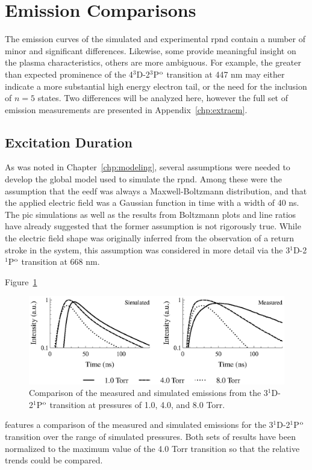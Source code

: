 \section{Emission Comparisons}

The emission curves of the simulated and experimental \acs{rpnd} contain a
number of minor and significant differences. Likewise, some provide meaningful
insight on the plasma characteristics, others are more ambiguous. For example,
the greater than expected prominence of the 4$^3$D-2$^3$P$^\mathrm{o}$ transition at
447 nm may either indicate a more substantial high energy electron tail, or the
need for the inclusion of $n=5$ states. Two differences will be analyzed here,
however the full set of emission measurements are presented in
Appendix~\ref{chp:extraem}.

\subsection{Excitation Duration}

As was noted in Chapter~\ref{chp:modeling}, several assumptions were needed to
develop the global model used to simulate the \acs{rpnd}. Among these were the
assumption that the \acs{eedf} was always a Maxwell-Boltzmann distribution, and
that the applied electric field was a Gaussian function in time with a width of
40 ns. The \acs{pic} simulations as well as the results from Boltzmann plots and
line ratios have already suggested that the former assumption is not rigorously
true. While the electric field shape was originally inferred from the
observation of a return stroke in the system, this assumption was considered in
more detail via the 3$^1$D-2$^1$P$^\mathrm{o}$ transition at 668 nm.

Figure~\ref{fig:dpcomp}
\begin{figure}
  \centering
  \includegraphics{./chapters/emissions/figures/dpcomp.eps}
  \caption{Comparison of the measured and simulated emissions from the
  3$^1$D-2$^1$P$^\mathrm{o}$ transition at pressures of 1.0, 4.0, and 8.0 Torr.}
  \label{fig:dpcomp}
\end{figure}
features a comparison of the measured and simulated emissions for the
3$^1$D-2$^1$P$^\mathrm{o}$ transition over the range of simulated pressures. Both sets
of results have been normalized to the maximum value of the 4.0 Torr transition
so that the relative trends could be compared. 

